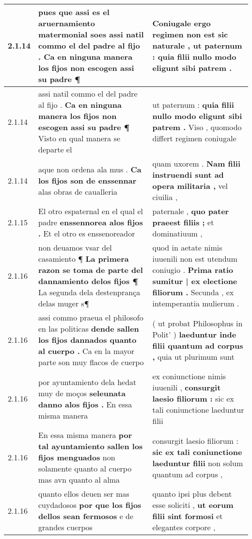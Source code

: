 \begin{tabular}{|p{1cm}|p{6.5cm}|p{6.5cm}|}
2.1.14 & pues que assi es el aruernamiento matermonial soes \textbf{ assi natil commo el del padre al fijo . } Ca en ninguna manera los fijos non escogen assi su padre ¶ & Coniugale ergo regimen non est sic naturale , \textbf{ ut paternum : } quia filii nullo modo eligunt sibi patrem . \\\hline
2.1.14 & assi natil commo el del padre al fijo . \textbf{ Ca en ninguna manera los fijos non escogen assi su padre ¶ } Visto en qual manera se departe el & ut paternum : \textbf{ quia filii nullo modo eligunt sibi patrem . } Viso , quomodo differt regimen coniugale \\\hline
2.1.14 & aque non ordena ala mus . \textbf{ Ca los fijos son de enssennar } alas obras de caualleria & quam uxorem . \textbf{ Nam filii instruendi sunt ad opera militaria , } vel ciuilia , \\\hline
2.1.15 & El otro espaternal en el qual el padre \textbf{ enssennorea alos fijos . } Et el otro es enssenoreador & paternale , \textbf{ quo pater praeest filiis ; } et dominatiuum , \\\hline
2.1.16 & non deuamos vsar del casamiento ¶ \textbf{ La primera razon se toma de parte del dannamiento delos fijos ¶ } La segunda dela destenprança delas muger s¶ & quod in aetate nimis iuuenili non est utendum coniugio . \textbf{ Prima ratio sumitur | ex electione filiorum . } Secunda , ex intemperantia mulierum . \\\hline
2.1.16 & assi commo praeua el philosofo en las politicas \textbf{ dende sallen los fijos dannados quanto al cuerpo . } Ca en la mayor parte son muy flacos de cuerpo & ( ut probat Philosophus in Polit’ ) \textbf{ laeduntur inde filii quantum ad corpus , } quia ut plurimum sunt \\\hline
2.1.16 & por ayuntamiento dela hedat muy de moços \textbf{ seleunata danno alos fijos . } En essa misma manera & ex coniunctione nimis iuuenili , \textbf{ consurgit laesio filiorum : } sic ex tali coniunctione laeduntur filii \\\hline
2.1.16 & En essa misma manera \textbf{ por tal ayuntamiento sallen los fijos menguados } non solamente quanto al cuerpo mas avn quanto al alma & consurgit laesio filiorum : \textbf{ sic ex tali coniunctione laeduntur filii } non solum quantum ad corpus , \\\hline
2.1.16 & quanto ellos deuen ser mas cuydadosos \textbf{ por que los fijos dellos sean fermosos } e de grandes cuerpos & quanto ipsi plus debent esse soliciti , \textbf{ ut eorum filii sint formosi } et elegantes corpore , \\\hline

\end{tabular}
